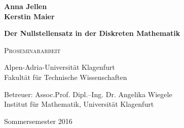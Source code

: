 \documentclass{article}
\theoremstyle{dotless}
\begin{document}
%
%


\begin{titlepage}
\vspace*{1cm}
  \begin{center}   
	    \LARGE \textbf{Anna Jellen} \\
      \LARGE \textbf{Kerstin Maier}
  \end{center}
\vspace{1cm}
  \begin{center}
 \Huge \textbf{Der Nullstellensatz in der Diskreten Mathematik} 
  \end{center}
\vspace{1cm}
\begin{center}
\huge  \textsc{Proseminararbeit}
\end{center}
\vspace{1cm}
\begin{center}
\LARGE Alpen-Adria-Universit\"{a}t Klagenfurt\\
\LARGE Fakult\"{a}t f\"{u}r  Technische Wissenschaften
\end{center}
\vspace{1.5cm}
\Large
\begin{center}
 Betreuer:   Assoc.Prof. Dipl.--Ing. Dr. Angelika Wiegele 
 \\ Institut f\"{u}r Mathematik, Universität Klagenfurt\\ \end{center}
  \begin{flushright} Sommersemester 2016 \end{flushright}
\end{titlepage}
	


\nocite{*}

\renewcommand{\contentsname}{Inhaltsverzeichnis}

\tableofcontents








\listoffigures


\end{document}

